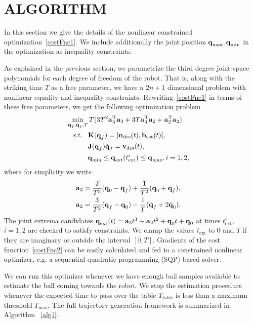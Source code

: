 \section{ALGORITHM}\label{alg}

In this section we give the details of the nonlinear constrained optimization~\eqref{costFnc1}. We include additionally the joint position $\boldsymbol{\mathrm{q}}_{\textrm{max}}, \boldsymbol{\mathrm{q}}_{\textrm{min}}$ in the optimization as inequality constraints. 

As explained in the previous section, we parametrize the third degree joint-space polynomials for each degree of freedom of the robot. That is, along with the striking time $T$ as a free parameter, we have a $2n+1$ dimensional problem with nonlinear equality and inequality constraints. Rewriting~\eqref{costFnc1} in terms of these free parameters, we get the following optimization problem
%
\begin{align}
\min_{\boldsymbol{\mathrm{q}}_f,\dot{\boldsymbol{\mathrm{q}}}_f, T} & \, T(3T^2 \boldsymbol{\mathrm{a}}_3^{\mathrm{T}}\boldsymbol{\mathrm{a}}_3 + 3T \boldsymbol{\mathrm{a}}_3^{\mathrm{T}}\boldsymbol{\mathrm{a}}_2 + \boldsymbol{\mathrm{a}}_2^{\mathrm{T}}\boldsymbol{\mathrm{a}}_2)  \label{costFnc2} \\
\textrm{s.t. \ } & \boldsymbol{\mathrm{K}}(\boldsymbol{\mathrm{q}}_f) = [\boldsymbol{\mathrm{n}}_{\mathrm{des}}(t),\boldsymbol{\mathrm{b}}_{\mathrm{est}}(t)], \\
&\boldsymbol{\mathrm{J}}(\boldsymbol{\mathrm{q}}_f)\dot{\boldsymbol{\mathrm{q}}}_f = \boldsymbol{\mathrm{v}}_{\mathrm{des}}(t), \\
& \boldsymbol{\mathrm{q}}_{\textrm{min}} \leq \boldsymbol{\mathrm{q}}_{\mathrm{ext}}(t_{\mathrm{ext}}^{i}) \leq \boldsymbol{\mathrm{q}}_{\textrm{max}}, i = 1,2,
\end{align}
%
\noindent where for simplicity we write 
%
\begin{align}
\boldsymbol{\mathrm{a}}_3 &= \frac{2}{T^3}(\boldsymbol{\mathrm{q}}_0 - \boldsymbol{\mathrm{q}}_f) + \frac{1}{T^2}(\dot{\boldsymbol{\mathrm{q}}}_0 + \dot{\boldsymbol{\mathrm{q}}}_f), \\
\boldsymbol{\mathrm{a}}_2 &= \frac{3}{T^2}(\boldsymbol{\mathrm{q}}_f - \boldsymbol{\mathrm{q}}_0) - \frac{1}{T}(\dot{\boldsymbol{\mathrm{q}}}_f + 2\dot{\boldsymbol{\mathrm{q}}}_0).
\end{align}
%
The joint extrema candidates $\boldsymbol{\mathrm{q}}_{\mathrm{ext}}(t) = \boldsymbol{\mathrm{a}}_3 t^3  + \boldsymbol{\mathrm{a}}_2 t^2 + \dot{\boldsymbol{\mathrm{q}}}_0 t + \boldsymbol{\mathrm{q}}_0$ at times $t_{\mathrm{ext}}^{i}$, $i = 1,2$ are checked to satisfy constraints. We clamp the values $t_{\mathrm{ext}}$ to $0$ and $T$ if they are imaginary or outside the interval $[0,T]$. Gradients of the cost function~\eqref{costFnc2} can be easily calculated and fed to a constrained nonlinear optimizer, e.g. a sequential quadratic programming (SQP) based solver. 

We can run this optimizer whenever we have enough ball samples available to estimate the ball coming towards the robot. We stop the estimation procedure whenever the expected time to pass over the table $T_{\mathrm{table}}$ is less than a maximum threshold $T_{\mathrm{max}}$. The full trajectory generation framework is summarized in Algorithm ~\ref{alg1}.

